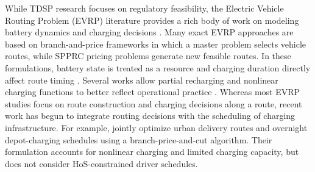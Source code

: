 \documentclass[3p,11pt,authoryear]{elsarticle}  %
\begin{document}
While TDSP research focuses on regulatory feasibility, the Electric Vehicle Routing Problem (EVRP) literature provides a rich body of work on modeling battery dynamics and charging decisions \citep{schneider2014electric, han2025uncertainty}. 
Many exact EVRP approaches are based on branch-and-price frameworks in which a master problem selects vehicle routes, while SPPRC pricing problems generate new feasible routes. In these formulations, battery state is treated as a resource and charging duration directly affect route timing \citep{desaulniers2016exact, lam2022branch, nafstad2025branch}. Several works allow partial recharging and nonlinear charging functions to better reflect operational practice \citep{montoya2017electric, froger2019improved}. Whereas most EVRP studies focus on route construction and charging decisions along a route, recent work has begun to integrate routing decisions with the scheduling of charging infrastructure. For example, \citet{yamin2025electric} jointly optimize urban delivery routes and overnight depot-charging schedules using a branch-price-and-cut algorithm. Their formulation accounts for nonlinear charging and limited charging capacity, but does not consider HoS-constrained driver schedules.
\end{document}

